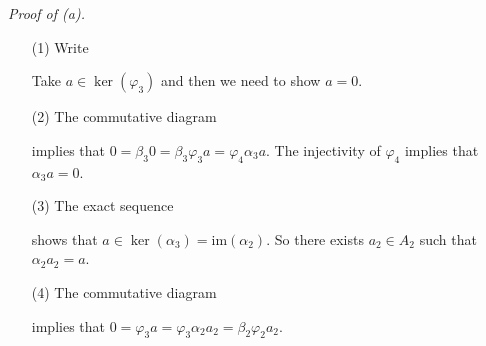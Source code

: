 \documentclass{article}
\begin{document}
\emph{Proof of (a).}
\begin{enumerate}
\item[(1)]
  Write
  \begin{center}
  \end{center}
  Take $a \in \ker(\varphi_3)$ and then we need to show $a = 0$.

\item[(2)]
  The commutative diagram
  \begin{center}
  \end{center}
  implies that $0 = \beta_3 0 = \beta_3 \varphi_3 a = \varphi_4 \alpha_3 a$.
  The injectivity of $\varphi_4$ implies that $\alpha_3 a = 0$.

\item[(3)]
  The exact sequence
  \begin{center}
  \end{center}
  shows that $a \in \ker(\alpha_3) = \mathrm{im}(\alpha_2)$.
  So there exists $a_2 \in A_2$ such that $\alpha_2 a_2 = a$.

\item[(4)]
  The commutative diagram
  \begin{center}
  \end{center}
  implies that $0 = \varphi_3 a = \varphi_3 \alpha_2 a_2 = \beta_2 \varphi_2 a_2$.


\end{enumerate}
\end{document}
